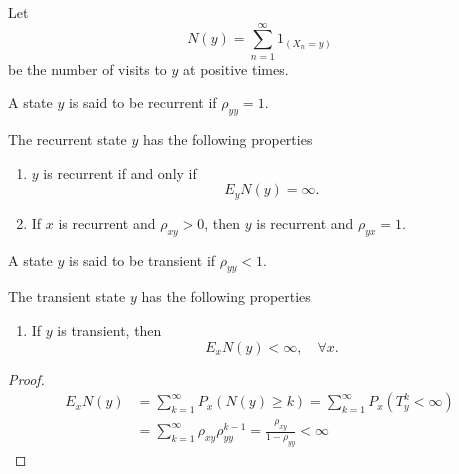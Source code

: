 Let
\begin{equation}
    N(y)=\sum_{n=1}^{\infty}1_{\left(X_{n}=y\right)}
\end{equation}
be the number of visits to $y$ at positive times.

\begin{definition}[Recurrent]
    A state $y$ is said to be recurrent if $\rho_{yy}=1$.
\end{definition}

\begin{property}
    The recurrent state $y$ has the following properties
    \begin{enumerate}
        \item $y$ is recurrent if and only if
              \begin{equation*}
                  E_{y}N(y)=\infty.
              \end{equation*}
        \item If $x$ is recurrent and $\rho_{xy}>0$, then $y$ is recurrent and $\rho_{yx}=1$.
    \end{enumerate}
\end{property}

\begin{definition}
    A state $y$ is said to be transient if $\rho_{yy}<1$.
\end{definition}

\begin{property}
    The transient state $y$ has the following properties
    \begin{enumerate}
        \item If $y$ is transient, then
              \begin{equation*}
                  E_{x}N(y)<\infty,\quad\forall x.
              \end{equation*}
    \end{enumerate}
\end{property}

\begin{proof}
    \begin{equation*}
        \begin{aligned}
            E_{x}N(y) & =\sum_{k=1}^{\infty}P_{x}(N(y)\geq k)=\sum_{k=1}^{\infty}P_{x}\left(T_{y}^{k}<\infty\right) \\
                      & =\sum_{k=1}^{\infty}\rho_{xy}\rho_{yy}^{k-1}=\frac{\rho_{xy}}{1-\rho_{yy}}<\infty
        \end{aligned}
    \end{equation*}
\end{proof}

